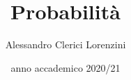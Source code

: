 \documentclass[a4paper]{article}
\begin{document}
\title{Probabilità}
\author{Alessandro Clerici Lorenzini}
\date{anno accademico 2020/21}
\maketitle
\tableofcontents








\end{document}
